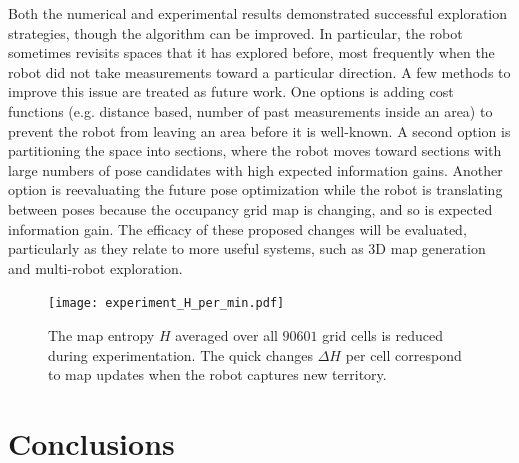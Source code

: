 \documentclass[smallextended]{svjour3}       %
\begin{document}
Both the numerical and experimental results demonstrated successful exploration strategies, though the algorithm can be improved. In particular, the robot sometimes revisits spaces that it has explored before, most frequently when the robot did not take measurements toward a particular direction. A few methods to improve this issue are treated as future work. One options is adding cost functions (e.g. distance based, number of past measurements inside an area) to prevent the robot from leaving an area before it is well-known. A second option is partitioning the space into sections, where the robot moves toward sections with large numbers of pose candidates with high expected information gains. Another option is reevaluating the future pose optimization while the robot is translating between poses because the occupancy grid map is changing, and so is expected information gain. The efficacy of these proposed changes will be evaluated, particularly as they relate to more useful systems, such as 3D map generation and multi-robot exploration.


\begin{figure}
	\centering
	\texttt{[image: experiment\_H\_per\_min.pdf]}
	\caption{The map entropy $H$ averaged over all $90601$ grid cells is reduced during experimentation. The quick changes $\Delta H$ per cell correspond to map updates when the robot captures new territory.}
\label{fig:ExperimentH}
\end{figure}
















\section{Conclusions}
\label{sec:Conclusion}
\end{document}
